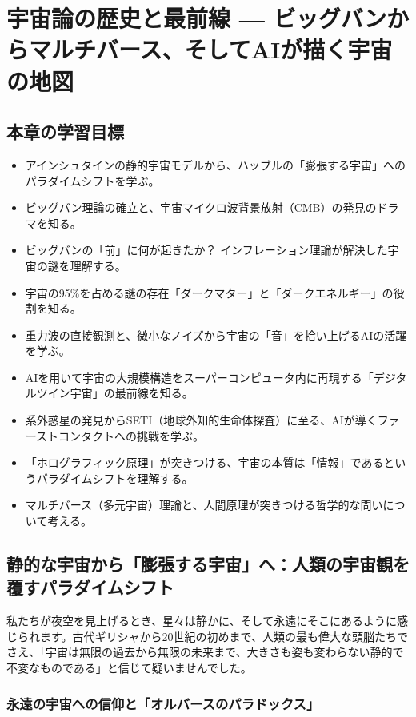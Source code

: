 \chapter{宇宙論の歴史と最前線 --- ビッグバンからマルチバース、そしてAIが描く宇宙の地図}

\section*{本章の学習目標}
\begin{itemize}
\item アインシュタインの静的宇宙モデルから、ハッブルの「膨張する宇宙」へのパラダイムシフトを学ぶ。
\item ビッグバン理論の確立と、宇宙マイクロ波背景放射（CMB）の発見のドラマを知る。
\item ビッグバンの「前」に何が起きたか？ インフレーション理論が解決した宇宙の謎を理解する。
\item 宇宙の95\%を占める謎の存在「ダークマター」と「ダークエネルギー」の役割を知る。
\item 重力波の直接観測と、微小なノイズから宇宙の「音」を拾い上げるAIの活躍を学ぶ。
\item AIを用いて宇宙の大規模構造をスーパーコンピュータ内に再現する「デジタルツイン宇宙」の最前線を知る。
\item 系外惑星の発見からSETI（地球外知的生命体探査）に至る、AIが導くファーストコンタクトへの挑戦を学ぶ。
\item 「ホログラフィック原理」が突きつける、宇宙の本質は「情報」であるというパラダイムシフトを理解する。
\item マルチバース（多元宇宙）理論と、人間原理が突きつける哲学的な問いについて考える。
\end{itemize}

\section{静的な宇宙から「膨張する宇宙」へ：人類の宇宙観を覆すパラダイムシフト}

私たちが夜空を見上げるとき、星々は静かに、そして永遠にそこにあるように感じられます。古代ギリシャから20世紀の初めまで、人類の最も偉大な頭脳たちでさえ、「宇宙は無限の過去から無限の未来まで、大きさも姿も変わらない静的で不変なものである」と信じて疑いませんでした。

\subsection{永遠の宇宙への信仰と「オルバースのパラドックス」}

